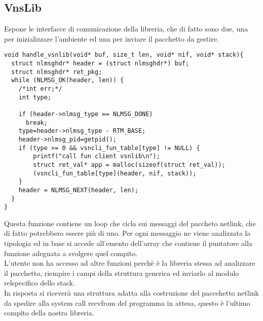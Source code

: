 \subsection{VnsLib}
Espone le interfacce di comunicazione della libreria, che di fatto sono due, una per inizializzare l'ambiente ed una per inviare il pacchetto da gestire.\\
\begin{lstlisting}[style=CStyle]
void handle_vsnlib(void* buf, size_t len, void* nif, void* stack){
  struct nlmsghdr* header = (struct nlmsghdr*) buf;
  struct nlmsghdr* ret_pkg;
  while (NLMSG_OK(header, len)) {
    /*int err;*/
    int type;

    if (header->nlmsg_type == NLMSG_DONE)
      break;
    type=header->nlmsg_type - RTM_BASE;
    header->nlmsg_pid=getpid();
    if (type >= 0 && vsncli_fun_table[type] != NULL) {
        printf("call fun client vsnlib\n");
        struct ret_val* app = malloc(sizeof(struct ret_val));
        (vsncli_fun_table[type](header, nif, stack));
    }
    header = NLMSG_NEXT(header, len);
  }
}
\end{lstlisting}
Questa funzione contiene un loop che cicla sui messaggi del paccheto netlink, che di fatto potrebbero essere pi\`u di uno. Per ogni messaggio ne viene analizzata la tipologia ed in base si accede all'emento dell'array che contiene il puntatore alla funzione adeguata a svolgere quel compito.\\
L'utente non ha accesso ad altre funzioni perch\`e \`e la libreria stessa ad analizzare il pacchetto, riempire i campi della struttura generica ed inviarlo al modulo relspecifico dello stack.\\
In risposta si ricever\`a una struttura adatta alla costruzione del paccehetto netlink da spedire alla system call recvfrom del programma in attesa, questo \`e l'ultimo compito della nostra libreria.
